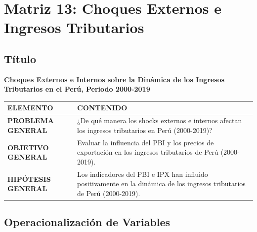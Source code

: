 \documentclass[
  man,
  floatsintext,
  longtable,
  a4paper,
  nolmodern,
  notxfonts,
  notimes,
  12pt,
  colorlinks=true,linkcolor=blue,citecolor=blue,urlcolor=blue]{apa7}
\newcounter{none} %
\begin{document}
\section{Matriz 13: Choques Externos e Ingresos
Tributarios}\label{matriz-13-choques-externos-e-ingresos-tributarios}

\subsection{Título}\label{tuxedtulo-12}

\textbf{Choques Externos e Internos sobre la Dinámica de los Ingresos
Tributarios en el Perú, Periodo 2000-2019}

{\def\LTcaptype{none} %
\begin{longtable}[]{@{}
  >{\raggedright\arraybackslash}p{}
  >{\raggedright\arraybackslash}p{}@{}}
\toprule\noalign{}
\begin{minipage}[b]{\linewidth}\raggedright
ELEMENTO
\end{minipage} & \begin{minipage}[b]{\linewidth}\raggedright
CONTENIDO
\end{minipage} \\
\midrule\noalign{}
\endhead
\bottomrule\noalign{}
\endlastfoot
\textbf{PROBLEMA GENERAL} & ¿De qué manera los shocks externos e
internos afectan los ingresos tributarios en Perú (2000-2019)? \\
\textbf{OBJETIVO GENERAL} & Evaluar la influencia del PBI y los precios
de exportación en los ingresos tributarios de Perú (2000-2019). \\
\textbf{HIPÓTESIS GENERAL} & Los indicadores del PBI e IPX han influido
positivamente en la dinámica de los ingresos tributarios de Perú
(2000-2019). \\
\end{longtable}
}

\subsection{Operacionalización de
Variables}\label{operacionalizaciuxf3n-de-variables-2}
\end{document}
